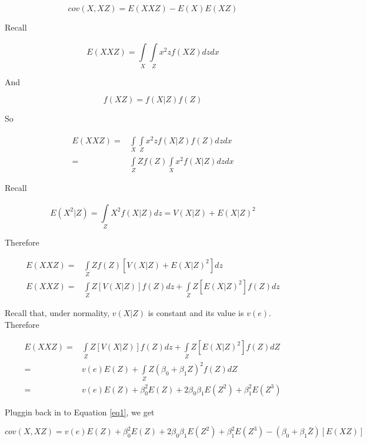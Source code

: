 \documentclass[doc, babel,english]{apa}%
\begin{document}
\begin{equation}
cov(X,XZ) = E(XXZ) - E(X)E(XZ)
\label{eq1}
\end{equation}
 
 Recall 
 \newcommand{\Int}{\int\limits}
 
 \begin{equation}
 \nonumber E(XXZ) =\Int_{X}^{} \Int_{Z}^{} x^2zf(XZ)dzdx
 \end{equation}

And 

\begin{equation}
 \nonumber f(XZ) = f(X|Z)f(Z)
\end{equation}

So 

\begin{align}
 \nonumber E(XXZ) =& \Int_{X}^{} \Int_{Z}^{} x^2zf(X|Z)f(Z)dzdx \\
=& \Int_{Z}^{} Zf(Z) \Int_{X}^{} x^2f(X|Z)dzdx 
\end{align}

Recall

\begin{equation}
 \nonumber E(X^2|Z) = \Int_{Z}^{}X^2f(X|Z)dz = V(X|Z) + E(X|Z)^2
\end{equation}

Therefore

\begin{align}
 \nonumber E(XXZ) =& \Int_{Z}^{} Zf(Z)[V(X|Z) + E(X|Z)^2] dz \\
 \nonumber E(XXZ) =& \Int_{Z}^{} Z[V(X|Z)]f(Z)dz + \Int_{Z}^{}Z[E(X|Z)^2]f(Z) dz
\end{align}

Recall that, under normality, $v(X|Z)$ is constant and its value is $v(e)$. Therefore

\begin{align}
 \nonumber E(XXZ) =& \Int_{Z}^{} Z[V(X|Z)]f(Z)dz + \Int_{Z}^{}Z[E(X|Z)^2]f(Z) dZ \\
 \nonumber 	=& v(e)E(Z) + \Int_{Z}^{} Z(\beta_0 + \beta_1Z)^2f(Z)dZ \\
 \nonumber 	=& v(e)E(Z) + \beta_0^2E(Z) + 2\beta_0\beta_1E(Z^2) + \beta_1^2E(Z^3)
\end{align}

Pluggin back in to Equation \ref{eq1}, we get

\begin{equation}
cov(X,XZ) = v(e)E(Z) + \beta_0^2E(Z) + 2\beta_0\beta_1E(Z^2) + \beta_1^2E(Z^3) - (\beta_0 + \beta_1\bar{Z})[E(XZ)]
\label{eq1}
\end{equation}
\end{document}
